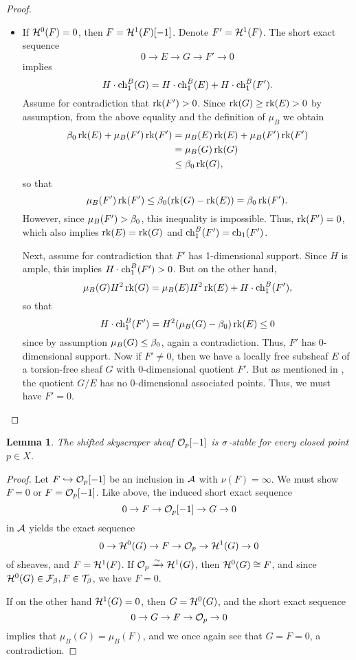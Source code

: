 \documentclass[letterpaper,12pt]{amsart}
\newtheorem{lem}[thm]{Lemma}
\theoremstyle{remark}
\begin{document}
\begin{proof}
\begin{itemize}
        \item If $\mathcal{H}^0(F) = 0$, then $F = \mathcal{H}^1(F)[-1]$. Denote $F' = \mathcal{H}^1(F)$. The short exact sequence
        \[ 0 \to E \to G \to F' \to 0 \]
        implies 
        \[ H\cdot \operatorname{\mathrm{ch}}^B_1(G) = H\cdot \operatorname{\mathrm{ch}}^B_1(E) + H\cdot \operatorname{\mathrm{ch}}^B_1(F'). \]
        Assume for contradiction that $\operatorname{\mathrm{rk}}(F') > 0$. Since $\operatorname{\mathrm{rk}}(G) \ge \operatorname{\mathrm{rk}}(E) > 0$ by assumption, from the above equality and the definition of $\mu_B$ we obtain
        \begin{align*} \beta_0 \operatorname{\mathrm{rk}}(E) + \mu_B(F') \operatorname{\mathrm{rk}}(F') & = \mu_B(E) \operatorname{\mathrm{rk}}(E) + \mu_B(F') \operatorname{\mathrm{rk}}(F') \\
        & = \mu_B(G) \operatorname{\mathrm{rk}}(G) \\
        & \le \beta_0 \operatorname{\mathrm{rk}}(G), \end{align*}
        so that
        \[ \mu_B(F') \operatorname{\mathrm{rk}}(F') \le \beta_0(\operatorname{\mathrm{rk}}(G) -  \operatorname{\mathrm{rk}}(E)) = \beta_0 \operatorname{\mathrm{rk}}(F'). \]
        However, since $\mu_B(F') > \beta_0$, this inequality is impossible. Thus, $\operatorname{\mathrm{rk}}(F') = 0$, which also implies $\operatorname{\mathrm{rk}}(E) = \operatorname{\mathrm{rk}}(G)$ and $\operatorname{\mathrm{ch}}^B_1(F') = \operatorname{\mathrm{ch}}_1(F')$. 
        
        Next, assume for contradiction that $F'$ has 1-dimensional support. Since $H$ is ample, this implies $H \cdot \operatorname{\mathrm{ch}}^B_1(F') > 0$. But on the other hand, 
        \[ \mu_B(G) H^2 \operatorname{\mathrm{rk}}(G) = \mu_B(E) H^2 \operatorname{\mathrm{rk}}(E) + H \cdot \operatorname{\mathrm{ch}}^B_1(F'), \]
        so that
        \[ H \cdot \operatorname{\mathrm{ch}}^B_1(F') = H^2 (\mu_B(G) - \beta_0)\operatorname{\mathrm{rk}}(E) \le 0 \]
        since by assumption $\mu_B(G) \le \beta_0$, again a contradiction. Thus, $F'$ has 0-dimensional support. Now if $F' \neq 0$, then we have a locally free subsheaf $E$ of a torsion-free sheaf $G$ with 0-di\-men\-sion\-al quotient $F'$. But as mentioned in \cite[Example 1.1.16]{HL}, the quotient $G/E$ has no 0-dimensional associated points. Thus, we must have $F' = 0$.
    \end{itemize} 
\end{proof}

\begin{lem}\label{skyscraperIsSigmaStable}
    The shifted skyscraper sheaf $\mathcal{O}_p[-1]$ is $\sigma$-stable for every closed point $p \in X$.
\end{lem}
\begin{proof}
    Let $F \hookrightarrow \mathcal{O}_p[-1]$ be an inclusion in $\mathcal{A}$ with $\nu(F) = \infty$. We must show $F = 0$ or $F = \mathcal{O}_p[-1]$. Like above, the induced short exact sequence
    \[ 0 \to F \to \mathcal{O}_p[-1] \to G \to 0 \]
    in $\mathcal{A}$ yields the exact sequence
    \[ 0 \to \mathcal{H}^0(G) \to F \to \mathcal{O}_p \to \mathcal{H}^1(G) \to 0 \]
    of sheaves, and $F = \mathcal{H}^1(F)$. If $\mathcal{O}_p \xrightarrow{\sim} \mathcal{H}^1(G)$, then $\mathcal{H}^0(G) \cong F$, and since $\mathcal{H}^0(G) \in \mathcal{F}_\beta, F \in \mathcal{T}_\beta$, we have $F = 0$.
    
    If on the other hand $\mathcal{H}^1(G) = 0$, then $G = \mathcal{H}^0(G)$, and the short exact sequence
    \[ 0 \to G \to F \to \mathcal{O}_p \to 0 \]
    implies that $\mu_B(G) = \mu_B(F)$, and we once again see that $G = F = 0$, a contradiction.
\end{proof}
\end{document}
